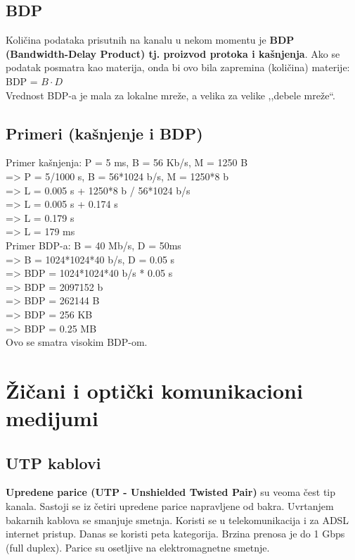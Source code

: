 \documentclass[a4paper]{article}
\begin{document}
    \subsection{BDP}
        Količina podataka prisutnih na kanalu u nekom momentu je \textbf{BDP (Bandwidth-Delay Product) tj. 
        proizvod protoka i kašnjenja}.
        Ako se podatak posmatra kao materija, onda bi ovo bila zapremina (količina) materije:\\
        \indent BDP = $B \cdot D$\\
        Vrednost BDP-a je mala za lokalne mreže, a velika za velike ,,debele mreže``.

    \subsection{Primeri (kašnjenje i BDP)}
        \noindent Primer kašnjenja: P = 5 ms, B = 56 Kb/s, M = 1250 B\\
        => P = 5/1000 s, B = 56*1024 b/s, M = 1250*8 b\\
        => L = 0.005 s + 1250*8 b / 56*1024 b/s\\
        => L = 0.005 s + 0.174 s\\
        => L = 0.179 s\\
        => L = 179 ms\\

        \noindent Primer BDP-a: B = 40 Mb/s, D = 50ms\\
        => B = 1024*1024*40 b/s, D = 0.05 s\\
        => BDP = 1024*1024*40 b/s * 0.05 s\\
        => BDP = 2097152 b\\
        => BDP = 262144 B\\
        => BDP = 256 KB\\
        => BDP = 0.25 MB\\
        Ovo se smatra visokim BDP-om.

\section{Žičani i optički komunikacioni medijumi}
    \subsection{UTP kablovi}
        \textbf{Upredene parice (UTP - Unshielded Twisted Pair)} su 
        veoma čest tip kanala. Sastoji se iz četiri upredene parice napravljene od bakra. Uvrtanjem
        bakarnih kablova se smanjuje smetnja. Koristi se u telekomunikacija i za ADSL internet pristup.
        Danas se koristi peta kategorija. Brzina prenosa je do 1 Gbps (full duplex). Parice su 
        osetljive na elektromagnetne smetnje. 
\end{document}
